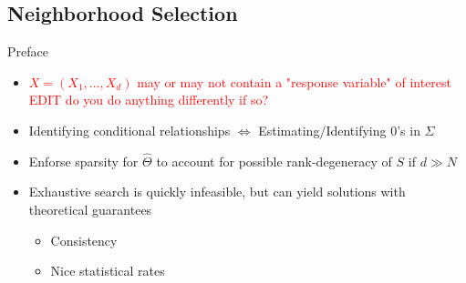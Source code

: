 \documentclass{beamer}
\begin{document}
\subsection{Neighborhood Selection}

\begin{frame}{Preface}
    \begin{itemize}\setlength\itemsep{6mm}
        \item \textcolor{red}{$X = (X_1, ..., X_d)$ may or may not contain a "response variable" of interest EDIT do you do anything differently if so?}
        \item Identifying conditional relationships $\Leftrightarrow$ Estimating/Identifying 0's in $\Sigma$
        \item Enforse sparsity for $\hat\Theta$ to account for possible rank-degeneracy of $S$ if $d \gg N$
        \item Exhaustive search is quickly infeasible, but can yield solutions with theoretical guarantees
        \begin{itemize} \item Consistency \item Nice statistical rates \end{itemize}
    \end{itemize}
\end{frame}
\end{document}
